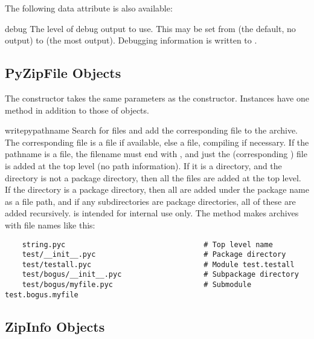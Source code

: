 The following data attribute is also available:

\begin{memberdesc}{debug}
  The level of debug output to use.  This may be set from 
  (the default, no output) to  (the most output).  Debugging
  information is written to .
\end{memberdesc}


\subsection{PyZipFile Objects \label{pyzipfile-objects}}

The  constructor takes the same parameters as the
 constructor.  Instances have one method in addition to
those of  objects.

\begin{methoddesc}[PyZipFile]{writepy}{pathname}
  Search for files  and add the corresponding file to the
  archive.  The corresponding file is a  file if
  available, else a  file, compiling if necessary.  If the
  pathname is a file, the filename must end with , and just
  the (corresponding ) file is added at the top level
  (no path information).  If it is a directory, and the directory is
  not a package directory, then all the files  are
  added at the top level.  If the directory is a package directory,
  then all  are added under the package name as a file
  path, and if any subdirectories are package directories, all of
  these are added recursively.   is intended for
  internal use only.  The  method makes archives
  with file names like this:

\begin{verbatim}
    string.pyc                                # Top level name 
    test/__init__.pyc                         # Package directory 
    test/testall.pyc                          # Module test.testall
    test/bogus/__init__.pyc                   # Subpackage directory 
    test/bogus/myfile.pyc                     # Submodule test.bogus.myfile
\end{verbatim}
\end{methoddesc}


\subsection{ZipInfo Objects \label{zipinfo-objects}}

